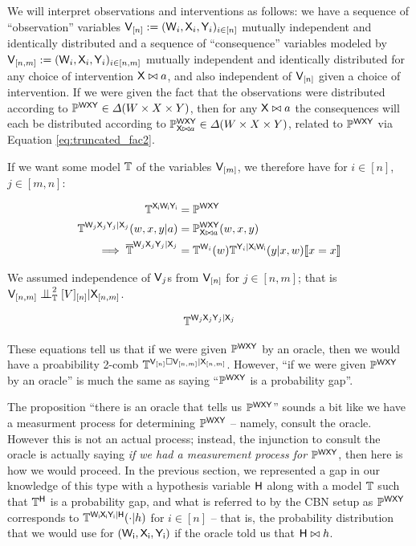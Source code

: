 We will interpret observations and interventions as follows: we have a sequence of ``observation'' variables $\mathsf{V}_{[n]}:=(\mathsf{W}_i,\mathsf{X}_i,\mathsf{Y}_i)_{i\in [n]}$ mutually independent and identically distributed and a sequence of ``consequence'' variables modeled by $\mathsf{V}_{[n,m]}:=(\mathsf{W}_i,\mathsf{X}_i,\mathsf{Y}_i)_{i\in [n,m]}$ mutually independent and identically distributed for any choice of intervention $\mathsf{X}\bowtie a$, and also independent of $\mathsf{V}_{[n]}$ given a choice of intervention. If we were given the fact that the observations were distributed according to $\mathbb{P}^{\mathsf{WXY}}\in \Delta(W\times X\times Y)$, then for any $\mathsf{X}\bowtie a$ the consequences will each be distributed according to $\mathbb{P}_{\mathsf{X}\bowtie a}^{\mathsf{W}\mathsf{X}\mathsf{Y}}\in \Delta(W\times X\times Y)$, related to $\mathbb{P}^{\mathsf{WXY}}$ via Equation \ref{eq:truncated_fac2}.

If we want some model $\mathbb{T}$ of the variables $\mathsf{V}_{[m]}$, we therefore have for $i\in [n]$, $j\in [m,n]$:

\begin{align}
    \mathbb{T}^{\mathsf{X_iW_iY_i}}&= \mathbb{P}^{\mathsf{WXY}}\\
    \mathbb{T}^{\mathsf{W}_j\mathsf{X}_j\mathsf{Y}_j|\mathsf{X}_j}(w,x,y|a) &= \mathbb{P}_{\mathsf{X}\bowtie a}^{\mathsf{W}\mathsf{X}\mathsf{Y}}(w,x,y)\\
    \implies \overline{\mathbb{T}}^{\mathsf{W}_j\mathsf{X}_j\mathsf{Y}_j|\mathsf{X}_j} &= \mathbb{T}^{\mathsf{W}_i}(w)\mathbb{T}^{\mathsf{Y}_i|\mathsf{X_iW_i}}(y|x,w)\llbracket x=x \rrbracket \label{eq:seedo_nohyp}
\end{align}



We assumed independence of $\mathsf{V}_j$s from $\mathsf{V}_{[n]}$ for $j\in [n,m]$; that is $\RV{V}_{[n,m]}\CI^2_{\prob{T}} \RV[V]_{[n]}|\RV{X}_{[n,m]}$. 

\begin{align}
    \mathbb{T}^{\mathsf{W}_j\mathsf{X}_j\mathsf{Y}_j|\mathsf{X}_j}
\end{align}

These equations tell us that if we were given $\mathbb{P}^{\mathsf{WXY}}$ by an oracle, then we would have a proabibility 2-comb $\mathbb{T}^{\mathsf{V}_{[n]}\square\mathsf{V}_{[n,m]}|\mathsf{X}_{[n,m]}}$. However, ``if we were given $\mathbb{P}^{\mathsf{WXY}}$ by an oracle'' is much the same as saying ``$\mathbb{P}^{\mathsf{WXY}}$ is a probability gap''. 



The proposition ``there is an oracle that tells us $\mathbb{P}^{\mathsf{WXY}}$'' sounds a bit like we have a measurment process for determining $\mathbb{P}^{\mathsf{WXY}}$ -- namely, consult the oracle. However this is not an actual process; instead, the injunction to consult the oracle is actually saying \emph{if we had a measurement process for} $\mathbb{P}^{\mathsf{WXY}}$, then here is how we would proceed. In the previous section, we represented a gap in our knowledge of this type with a hypothesis variable $\mathsf{H}$ along with a model $\mathbb{T}$ such that $\mathbb{T}^{\mathsf{H}}$ is a probability gap, and what is referred to by the CBN setup as $\mathbb{P}^{\mathsf{WXY}}$ corresponds to $\mathbb{T}^{\mathsf{W_iX_iY_i}|\mathsf{H}}(\cdot|h)$ for $i\in [n]$ -- that is, the probability distribution that we would use for $(\mathsf{W_i,X_i,Y_i})$ if the oracle told us that $\mathsf{H}\bowtie h$.


